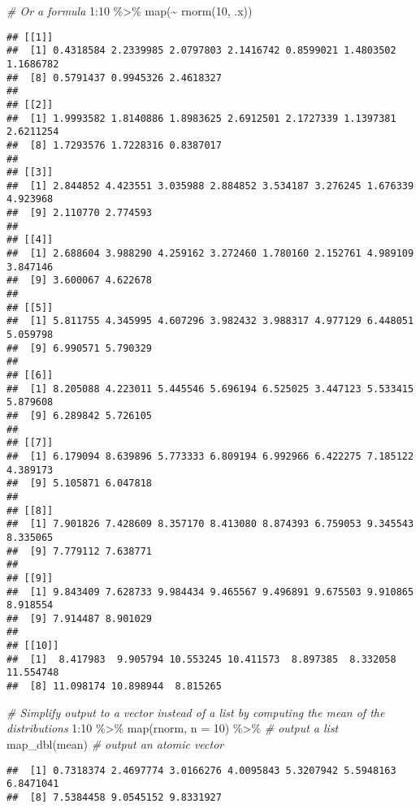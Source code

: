 \documentclass[
]{book}
\newenvironment{Shaded}{\begin{snugshade}}{\end{snugshade}}
\newcommand{\AttributeTok}[1]{\textcolor[rgb]{0.77,0.63,0.00}{#1}}
\newcommand{\CommentTok}[1]{\textcolor[rgb]{0.56,0.35,0.01}{\textit{#1}}}
\newcommand{\DecValTok}[1]{\textcolor[rgb]{0.00,0.00,0.81}{#1}}
\newcommand{\FunctionTok}[1]{\textcolor[rgb]{0.00,0.00,0.00}{#1}}
\newcommand{\NormalTok}[1]{#1}
\newcommand{\SpecialCharTok}[1]{\textcolor[rgb]{0.00,0.00,0.00}{#1}}
\begin{document}
\begin{Shaded}
\begin{Highlighting}[]
\CommentTok{\# Or a formula}
\DecValTok{1}\SpecialCharTok{:}\DecValTok{10} \SpecialCharTok{\%\textgreater{}\%}
  \FunctionTok{map}\NormalTok{(}\SpecialCharTok{\textasciitilde{}} \FunctionTok{rnorm}\NormalTok{(}\DecValTok{10}\NormalTok{, .x))}
\end{Highlighting}
\end{Shaded}

\begin{verbatim}
## [[1]]
##  [1] 0.4318584 2.2339985 2.0797803 2.1416742 0.8599021 1.4803502 1.1686782
##  [8] 0.5791437 0.9945326 2.4618327
## 
## [[2]]
##  [1] 1.9993582 1.8140886 1.8983625 2.6912501 2.1727339 1.1397381 2.6211254
##  [8] 1.7293576 1.7228316 0.8387017
## 
## [[3]]
##  [1] 2.844852 4.423551 3.035988 2.884852 3.534187 3.276245 1.676339 4.923968
##  [9] 2.110770 2.774593
## 
## [[4]]
##  [1] 2.688604 3.988290 4.259162 3.272460 1.780160 2.152761 4.989109 3.847146
##  [9] 3.600067 4.622678
## 
## [[5]]
##  [1] 5.811755 4.345995 4.607296 3.982432 3.988317 4.977129 6.448051 5.059798
##  [9] 6.990571 5.790329
## 
## [[6]]
##  [1] 8.205088 4.223011 5.445546 5.696194 6.525025 3.447123 5.533415 5.879608
##  [9] 6.289842 5.726105
## 
## [[7]]
##  [1] 6.179094 8.639896 5.773333 6.809194 6.992966 6.422275 7.185122 4.389173
##  [9] 5.105871 6.047818
## 
## [[8]]
##  [1] 7.901826 7.428609 8.357170 8.413080 8.874393 6.759053 9.345543 8.335065
##  [9] 7.779112 7.638771
## 
## [[9]]
##  [1] 9.843409 7.628733 9.984434 9.465567 9.496891 9.675503 9.910865 8.918554
##  [9] 7.914487 8.901029
## 
## [[10]]
##  [1]  8.417983  9.905794 10.553245 10.411573  8.897385  8.332058 11.554748
##  [8] 11.098174 10.898944  8.815265
\end{verbatim}

\begin{Shaded}
\begin{Highlighting}[]
\CommentTok{\# Simplify output to a vector instead of a list by computing the mean of the distributions}
\DecValTok{1}\SpecialCharTok{:}\DecValTok{10} \SpecialCharTok{\%\textgreater{}\%}
  \FunctionTok{map}\NormalTok{(rnorm, }\AttributeTok{n =} \DecValTok{10}\NormalTok{) }\SpecialCharTok{\%\textgreater{}\%}  \CommentTok{\# output a list}
  \FunctionTok{map\_dbl}\NormalTok{(mean)           }\CommentTok{\# output an atomic vector}
\end{Highlighting}
\end{Shaded}

\begin{verbatim}
##  [1] 0.7318374 2.4697774 3.0166276 4.0095843 5.3207942 5.5948163 6.8471041
##  [8] 7.5384458 9.0545152 9.8331927
\end{verbatim}
\end{document}
